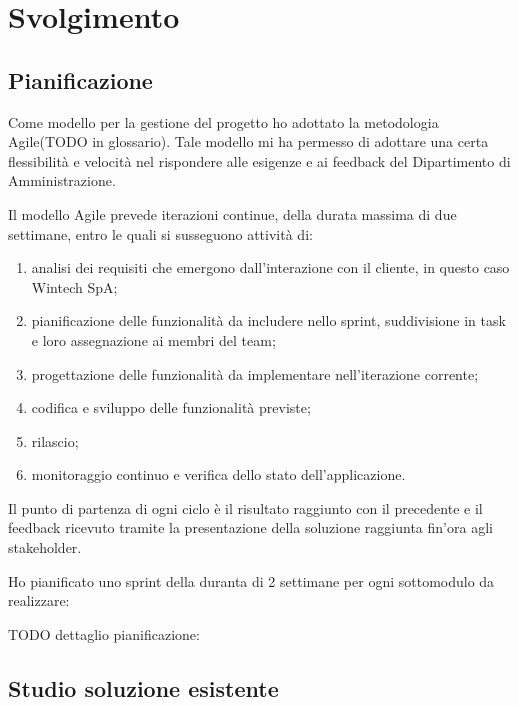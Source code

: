 
\chapter{Svolgimento}
\label{cap:svolgimento}


\section{Pianificazione}
	Come modello per la gestione del progetto ho adottato la metodologia Agile(TODO in glossario). Tale
	modello mi ha permesso di adottare una certa flessibilità e velocità nel rispondere alle
	esigenze e ai feedback del Dipartimento di Amministrazione.
	
	Il modello Agile prevede iterazioni continue, della durata massima di due settimane,
	entro le quali si susseguono attività di:
	\begin{enumerate}
		\item analisi dei requisiti che emergono dall’interazione con il cliente, in questo caso Wintech SpA;
		\item pianificazione delle funzionalità da includere nello sprint, suddivisione in task e loro assegnazione ai membri del team;
		\item progettazione delle funzionalità da implementare nell’iterazione corrente;
		\item codifica e sviluppo delle funzionalità previste;
		\item rilascio;
		\item monitoraggio continuo e verifica dello stato dell’applicazione.
	\end{enumerate}
		
	Il punto di partenza di ogni ciclo è il risultato raggiunto con il precedente e il feedback
	ricevuto tramite la presentazione della soluzione raggiunta fin’ora agli stakeholder.
	
	Ho pianificato uno sprint della duranta di 2 settimane per ogni sottomodulo da realizzare:

	TODO dettaglio pianificazione:
			

\section{Studio soluzione esistente}
	

